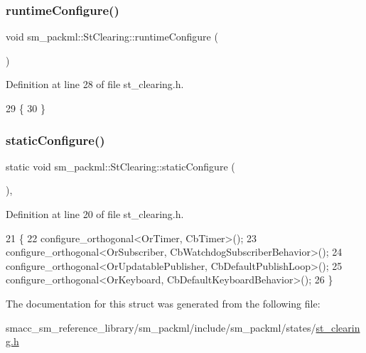 \subsubsection{\texorpdfstring{runtime\+Configure()}{runtimeConfigure()}}
{\footnotesize\ttfamily void sm\+\_\+packml\+::\+St\+Clearing\+::runtime\+Configure (\begin{DoxyParamCaption}{ }\end{DoxyParamCaption})\hspace{0.3cm}{\ttfamily [inline]}}



Definition at line 28 of file st\+\_\+clearing.\+h.


\begin{DoxyCode}
29     \{
30     \}
\end{DoxyCode}
\mbox{\label{structsm__packml_1_1StClearing_a2d4a6d6ec599117628988a5ce18bab8a}} 
\subsubsection{\texorpdfstring{static\+Configure()}{staticConfigure()}}
{\footnotesize\ttfamily static void sm\+\_\+packml\+::\+St\+Clearing\+::static\+Configure (\begin{DoxyParamCaption}{ }\end{DoxyParamCaption})\hspace{0.3cm}{\ttfamily [inline]}, {\ttfamily [static]}}



Definition at line 20 of file st\+\_\+clearing.\+h.


\begin{DoxyCode}
21     \{
22         configure\_orthogonal<OrTimer, CbTimer>();   
23         configure\_orthogonal<OrSubscriber, CbWatchdogSubscriberBehavior>();
24         configure\_orthogonal<OrUpdatablePublisher, CbDefaultPublishLoop>();
25         configure\_orthogonal<OrKeyboard, CbDefaultKeyboardBehavior>();
26     \}
\end{DoxyCode}


The documentation for this struct was generated from the following file\+:\begin{DoxyCompactItemize}
\item 
smacc\+\_\+sm\+\_\+reference\+\_\+library/sm\+\_\+packml/include/sm\+\_\+packml/states/\hyperlink{st__clearing_8h}{st\+\_\+clearing.\+h}\end{DoxyCompactItemize}
